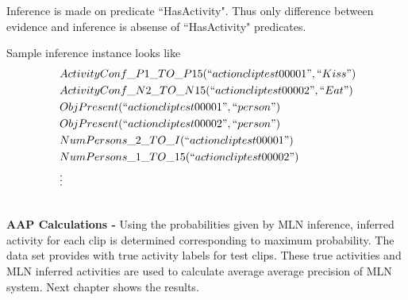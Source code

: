 Inference is made on predicate ``HasActivity". Thus only difference
between evidence and inference is absense of ``HasActivity" predicates.

Sample inference instance looks like
\begin{equation}
	\begin{split}
		~ & ActivityConf\_P1\_TO\_P15(``actioncliptest00001",``Kiss") \\
		~ & ActivityConf\_N2\_TO\_N15(``actioncliptest00002",``Eat") \\
		~ & ObjPresent(``actioncliptest00001",``person") \\
		~ & ObjPresent(``actioncliptest00002",``person") \\
		~ & NumPersons\_2\_TO\_I(``actioncliptest00001") \\
		~ & NumPersons\_1\_TO\_15(``actioncliptest00002") \\
		~ & \vdots
	\end{split}
\end{equation}

~ \\
{\bf AAP Calculations - }Using the probabilities given by MLN inference, inferred activity for each
clip is determined corresponding to maximum probability. The data set provides with true activity labels for test clips. 
These true activities and MLN inferred activities are used to calculate average average precision
of MLN system. Next chapter shows the results.


